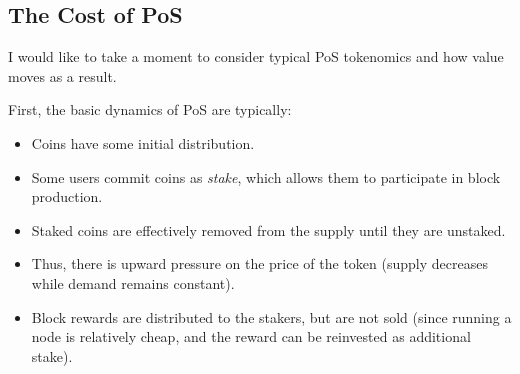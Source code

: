 \subsection{The Cost of PoS}

I would like to take a moment to consider typical PoS tokenomics and how value moves as a result.

First, the basic dynamics of PoS are typically:
\begin{itemize}
  \renewcommand{\baselinestretch}{1.0}
  \setlength{\itemsep}{-0.25\baselineskip}
  \item Coins have some initial distribution.
  \item Some users commit coins as \emph{stake}, which allows them to participate in block production.
  \item Staked coins are effectively removed from the supply until they are unstaked.
  \item Thus, there is upward pressure on the price of the token (supply decreases while demand remains constant).
  \item Block rewards are distributed to the stakers, but are not sold (since running a node is relatively\footnotemark{} cheap, and the reward can be reinvested as additional stake).
\end{itemize}


